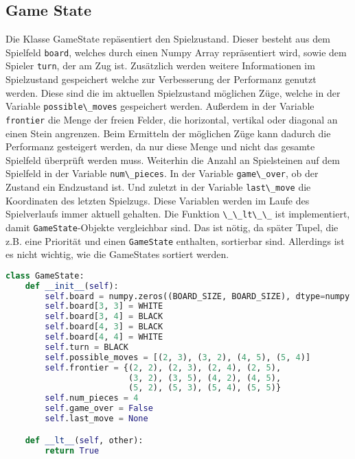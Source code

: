 \hypertarget{game-state}{%
\subsection{Game State}\label{game-state}}

Die Klasse GameState repäsentiert den Spielzustand. Dieser besteht aus
dem Spielfeld \passthrough{\lstinline!board!}, welches durch einen Numpy
Array repräsentiert wird, sowie dem Spieler
\passthrough{\lstinline!turn!}, der am Zug ist. Zusätzlich werden
weitere Informationen im Spielzustand gespeichert welche zur
Verbesserung der Performanz genutzt werden. Diese sind die im aktuellen
Spielzustand möglichen Züge, welche in der Variable
\passthrough{\lstinline!possible\_moves!} gespeichert werden. Außerdem
in der Variable \passthrough{\lstinline!frontier!} die Menge der freien
Felder, die horizontal, vertikal oder diagonal an einen Stein angrenzen.
Beim Ermitteln der möglichen Züge kann dadurch die Performanz gesteigert
werden, da nur diese Menge und nicht das gesamte Spielfeld überprüft
werden muss. Weiterhin die Anzahl an Spielsteinen auf dem Spielfeld in
der Variable \passthrough{\lstinline!num\_pieces!}. In der Variable
\passthrough{\lstinline!game\_over!}, ob der Zustand ein Endzustand ist.
Und zuletzt in der Variable \passthrough{\lstinline!last\_move!} die
Koordinaten des letzten Spielzugs. Diese Variablen werden im Laufe des
Spielverlaufs immer aktuell gehalten. Die Funktion
\passthrough{\lstinline!\_\_lt\_\_!} ist implementiert, damit
\passthrough{\lstinline!GameState!}-Objekte vergleichbar sind. Das ist
nötig, da später Tupel, die z.B. eine Priorität und einen
\passthrough{\lstinline!GameState!} enthalten, sortierbar sind.
Allerdings ist es nicht wichtig, wie die GameStates sortiert werden.

\begin{lstlisting}[language=Python]
class GameState:
    def __init__(self):
        self.board = numpy.zeros((BOARD_SIZE, BOARD_SIZE), dtype=numpy.int8)
        self.board[3, 3] = WHITE
        self.board[3, 4] = BLACK
        self.board[4, 3] = BLACK
        self.board[4, 4] = WHITE
        self.turn = BLACK
        self.possible_moves = [(2, 3), (3, 2), (4, 5), (5, 4)]
        self.frontier = {(2, 2), (2, 3), (2, 4), (2, 5),
                         (3, 2), (3, 5), (4, 2), (4, 5),
                         (5, 2), (5, 3), (5, 4), (5, 5)}
        self.num_pieces = 4
        self.game_over = False
        self.last_move = None

    def __lt__(self, other):
        return True
\end{lstlisting}

